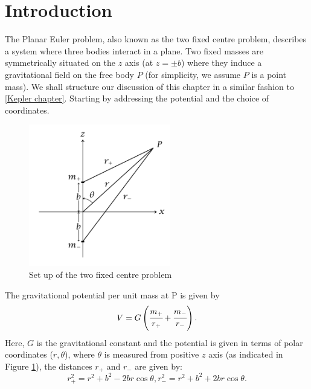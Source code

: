 \documentclass[12pt,oneside]{report}
\theoremstyle{definition}
\begin{document}
\section{Introduction}
The Planar Euler problem, also known as the two fixed centre problem, describes a system where three bodies interact in a plane. Two fixed masses are symmetrically situated  on the $z$ axis (at $z= \pm b$) where they induce a gravitational field on the free body $P$ (for simplicity, we assume $P$ is a point mass). We shall structure our discussion of this chapter in a similar fashion to \autoref{Kepler chapter}. Starting by addressing the potential and the choice of coordinates.
\begin{figure}[htbp]
    \centering
    \includegraphics[width=0.55\textwidth]{figures/Euler problem I.png}
    \caption{Set up of the two fixed centre problem \cite{o2008integrable}}
    \label{fig:Euler problem I}
\end{figure}
The gravitational potential per unit mass at P is given by
\begin{equation} \label{3.1}
  V = G\left( \cfrac{m_{+}}{r_{+}} + \cfrac{m_{-}}{r_{-}}\right).  
\end{equation} 
Here, $G$ is the gravitational constant and the potential is given in terms of polar coordinates ($r,\theta$), where $\theta$ is measured from positive $z$ axis  (as indicated in Figure \ref{fig:Euler problem I}), the distances $r_{+}$ and $r_{-}$ are given by:
\begin{subequations}
    \begin{equation}\label{3.2a}
        r_{+}^{2} = r^{2} + b^{2} - 2br\cos{\theta} ,
    \end{equation}
    \begin{equation}\label{3.2b}
        r_{-}^{2}=r^{2}+b^{2}+2br\cos{\theta}.
    \end{equation}
\end{subequations}
\end{document}
